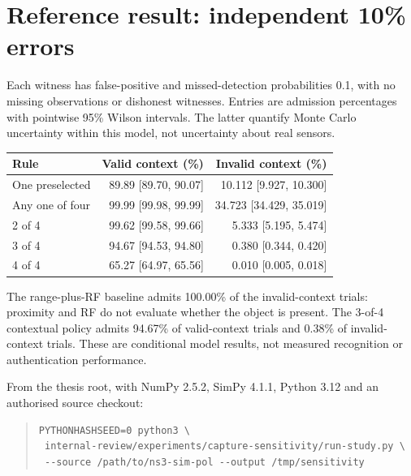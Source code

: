 \documentclass[11pt,a4paper]{article}
\begin{document}
\section*{Reference result: independent 10\% errors}
Each witness has false-positive and missed-detection probabilities 0.1, with no missing
observations or dishonest witnesses. Entries are admission percentages with pointwise 95\% Wilson
intervals. The latter quantify Monte Carlo uncertainty within this model, not uncertainty about real sensors.
\begin{center}\small\begin{tabular}{lrr}\toprule
Rule & Valid context (\%) & Invalid context (\%)\\\midrule
One preselected & 89.89 [89.70, 90.07] & 10.112 [9.927, 10.300] \\
Any one of four & 99.99 [99.98, 99.99] & 34.723 [34.429, 35.019] \\
2 of 4 & 99.62 [99.58, 99.66] & 5.333 [5.195, 5.474] \\
3 of 4 & 94.67 [94.53, 94.80] & 0.380 [0.344, 0.420] \\
4 of 4 & 65.27 [64.97, 65.56] & 0.010 [0.005, 0.018] \\
\bottomrule\end{tabular}\end{center}
The range-plus-RF baseline admits 100.00\% of the invalid-context trials:
proximity and RF do not evaluate whether the object is present. The 3-of-4 contextual policy admits
94.67\% of valid-context trials and 0.38\% of invalid-context trials.
These are conditional model results, not measured recognition or authentication performance.

From the thesis root, with NumPy 2.5.2, SimPy 4.1.1, Python 3.12 and an authorised source checkout:
\begin{quote}\footnotesize\begin{verbatim}
PYTHONHASHSEED=0 python3 \
 internal-review/experiments/capture-sensitivity/run-study.py \
 --source /path/to/ns3-sim-pol --output /tmp/sensitivity
\end{verbatim}\end{quote}
\end{document}
